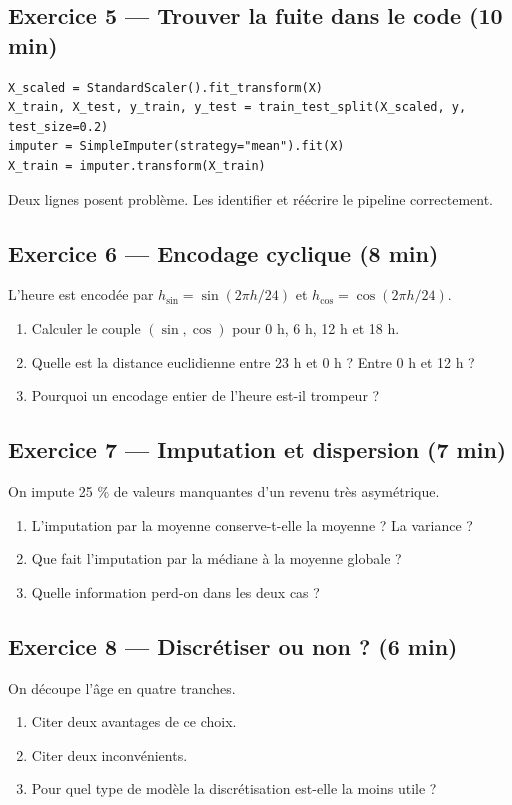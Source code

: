 \subsection*{Exercice 5 --- Trouver la fuite dans le code \hfill \normalfont\footnotesize (10 min)}
\begin{lstlisting}
X_scaled = StandardScaler().fit_transform(X)
X_train, X_test, y_train, y_test = train_test_split(X_scaled, y, test_size=0.2)
imputer = SimpleImputer(strategy="mean").fit(X)
X_train = imputer.transform(X_train)
\end{lstlisting}
Deux lignes posent problème. Les identifier et réécrire le pipeline correctement.


\subsection*{Exercice 6 --- Encodage cyclique \hfill \normalfont\footnotesize (8 min)}
L'heure est encodée par $h_{\sin}=\sin(2\pi h/24)$ et $h_{\cos}=\cos(2\pi h/24)$.
\begin{enumerate}
  \item Calculer le couple $(\sin,\cos)$ pour 0 h, 6 h, 12 h et 18 h.
  \item Quelle est la distance euclidienne entre 23 h et 0 h ? Entre 0 h et 12 h ?
  \item Pourquoi un encodage entier de l'heure est-il trompeur ?
\end{enumerate}

\subsection*{Exercice 7 --- Imputation et dispersion \hfill \normalfont\footnotesize (7 min)}
On impute 25 \% de valeurs manquantes d'un revenu très asymétrique.
\begin{enumerate}
  \item L'imputation par la moyenne conserve-t-elle la moyenne ? La variance ?
  \item Que fait l'imputation par la médiane à la moyenne globale ?
  \item Quelle information perd-on dans les deux cas ?
\end{enumerate}

\subsection*{Exercice 8 --- Discrétiser ou non ? \hfill \normalfont\footnotesize (6 min)}
On découpe l'âge en quatre tranches.
\begin{enumerate}
  \item Citer deux avantages de ce choix.
  \item Citer deux inconvénients.
  \item Pour quel type de modèle la discrétisation est-elle la moins utile ?
\end{enumerate}

